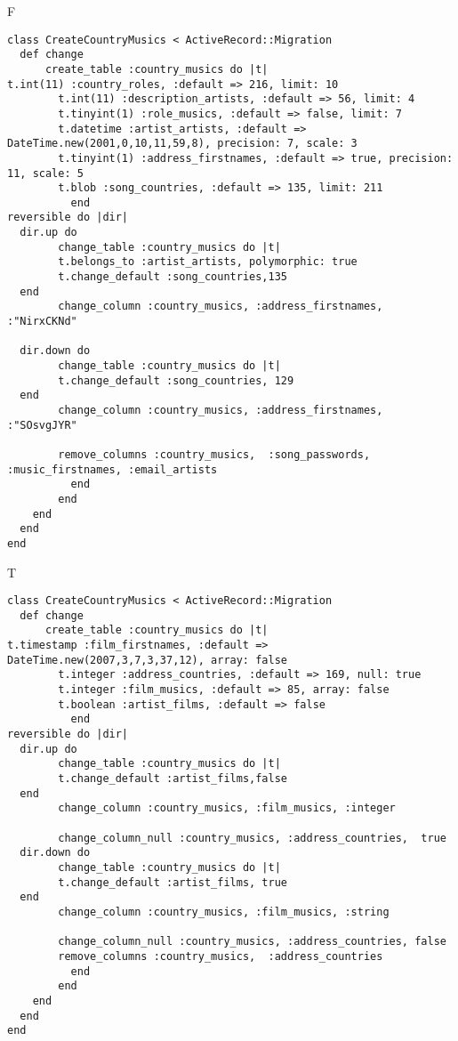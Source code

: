 F
\begin{verbatim}
class CreateCountryMusics < ActiveRecord::Migration
  def change
	  create_table :country_musics do |t|
t.int(11) :country_roles, :default => 216, limit: 10
		t.int(11) :description_artists, :default => 56, limit: 4
		t.tinyint(1) :role_musics, :default => false, limit: 7
		t.datetime :artist_artists, :default => DateTime.new(2001,0,10,11,59,8), precision: 7, scale: 3
		t.tinyint(1) :address_firstnames, :default => true, precision: 11, scale: 5
		t.blob :song_countries, :default => 135, limit: 211
		  end
reversible do |dir|
  dir.up do
		change_table :country_musics do |t|
		t.belongs_to :artist_artists, polymorphic: true
 		t.change_default :song_countries,135
  end
 		change_column :country_musics, :address_firstnames, :"NirxCKNd"
   
  dir.down do
		change_table :country_musics do |t|
		t.change_default :song_countries, 129
  end
 		change_column :country_musics, :address_firstnames, :"SOsvgJYR"
   
		remove_columns :country_musics,  :song_passwords, :music_firstnames, :email_artists 
	      end
	    end
    end 
  end
end

\end{verbatim}

T
\begin{verbatim}
class CreateCountryMusics < ActiveRecord::Migration
  def change
	  create_table :country_musics do |t|
t.timestamp :film_firstnames, :default => DateTime.new(2007,3,7,3,37,12), array: false
		t.integer :address_countries, :default => 169, null: true
		t.integer :film_musics, :default => 85, array: false
		t.boolean :artist_films, :default => false
		  end
reversible do |dir|
  dir.up do
		change_table :country_musics do |t|
		t.change_default :artist_films,false
  end
 		change_column :country_musics, :film_musics, :integer
   
		change_column_null :country_musics, :address_countries,  true
  dir.down do
		change_table :country_musics do |t|
		t.change_default :artist_films, true
  end
 		change_column :country_musics, :film_musics, :string
   
		change_column_null :country_musics, :address_countries, false
 		remove_columns :country_musics,  :address_countries 
	      end
	    end
    end 
  end
end

\end{verbatim}

